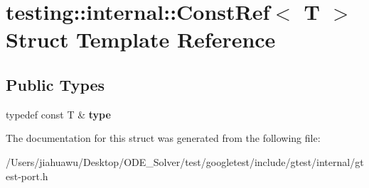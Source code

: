 \hypertarget{structtesting_1_1internal_1_1_const_ref}{}\section{testing\+:\+:internal\+:\+:Const\+Ref$<$ T $>$ Struct Template Reference}
\label{structtesting_1_1internal_1_1_const_ref}
\subsection*{Public Types}
\begin{DoxyCompactItemize}
\item 
\mbox{\label{structtesting_1_1internal_1_1_const_ref_a53610a4d0e72958332222b0a85f8937a}} 
typedef const T \& {\bfseries type}
\end{DoxyCompactItemize}


The documentation for this struct was generated from the following file\+:\begin{DoxyCompactItemize}
\item 
/\+Users/jiahuawu/\+Desktop/\+O\+D\+E\+\_\+\+Solver/test/googletest/include/gtest/internal/gtest-\/port.\+h\end{DoxyCompactItemize}
